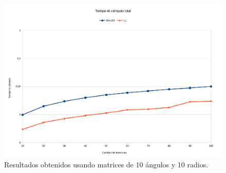 \begin{figure}[H]{}
\centering
\includegraphics[scale=0.5]{graphs/gaussVsLU3.pdf}
\caption{Resultados obtenidos usando matrices de 10 ángulos y 10 radios.}
\label{gaussVsLU3}


\end{figure}
